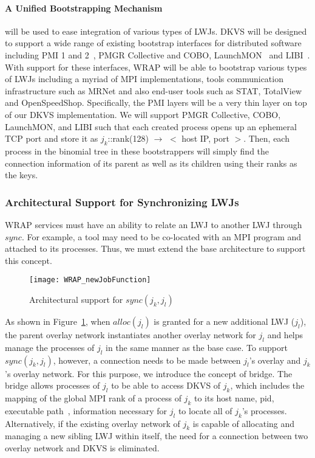 \paragraph{A Unified Bootstrapping Mechanism }
\label{sect:bootstrap}
will be used to ease integration of various types of LWJs.
DKVS will be designed to support a wide range of existing bootstrap interfaces
for distributed software including PMI 1 and 2~\cite{PMI2}, PMGR Collective and COBO,
LaunchMON~\cite{launchmon} and LIBI~\cite{libi}. With support for these interfaces,
WRAP will be able to bootstrap various types of LWJs including a myriad of
MPI implementations, tools communication infrastructure such as MRNet
and also end-user tools such as STAT, TotalView and OpenSpeedShop.
Specifically, the PMI layers will be a very thin layer on top
of our DKVS implementation. We will support PMGR Collective,
COBO, LaunchMON, and LIBI such that each created process opens
up an ephemeral TCP port and store it as $j_k$::rank(128) $\rightarrow$ $<$ host IP, port $>$.
Then, each process in the binomial tree in these bootstrappers
will simply find the connection information of its parent as well as
its children using their ranks as the keys.

\subsubsection{Architectural Support for Synchronizing LWJs}
\label{sect:sync}
WRAP services must have an ability to relate an LWJ to another LWJ through $sync$.
For example, a tool may need to be co-located with an MPI program
and attached to its processes.
Thus, we must extend the base architecture to support this concept.
\begin{figure}
  \centering
    \texttt{[image: WRAP\_newJobFunction]}
  \caption{Architectural support for ${sync(j_k, j_l)}$}
  \label{syncext}
\end{figure}
As shown in Figure~\ref{syncext}, when $alloc(j_l)$
is granted for a new additional LWJ ($j_l$),
the parent overlay network instantiates
another overlay network for $j_l$ and helps manage
the processes of $j_l$ in the same manner as the base case.
To support ${sync(j_k, j_l)}$,
however, a connection needs to be made between $j_l$'s
overlay and $j_k$'s overlay network.
For this purpose, we introduce the concept
of bridge. The bridge allows processes
of $j_l$ to be able to access DKVS of $j_k$, which includes
the mapping of the global MPI rank of a process of $j_k$
to its host name, pid, executable path~\cite{MPIRInterface},
information necessary for $j_l$ to locate all of $j_k$'s processes.
Alternatively, if the existing overlay network of $j_k$ is
capable of allocating and managing a new sibling LWJ
within itself, the need for a connection between two overlay
network and DKVS is eliminated.

